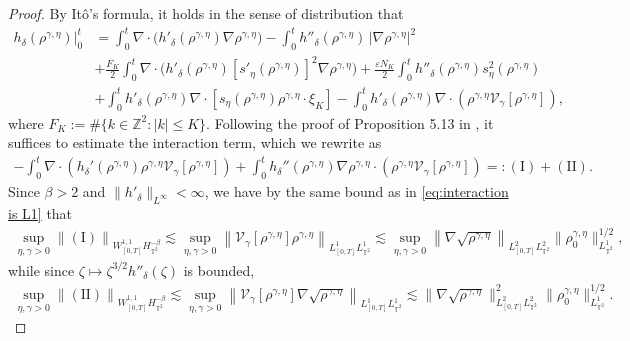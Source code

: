 \begin{proof}
By It\^o's formula, it holds in the sense of distribution that
\begin{align*}
h_{\delta}(\rho^{\gamma, \eta}) \Big|_0^t
& = \int_{0}^{t} \nabla \cdot \big(h'_{\delta}(\rho^{\gamma, \eta}) \nabla \rho^{\gamma, \eta}\big)
 - \int_{0}^{t} h''_{\delta}(\rho^{\gamma, \eta}) \, |\nabla \rho^{\gamma, \eta}|^{2} \\
& + \frac{F_K}{2}\int_{0}^{t} \nabla \cdot \big(h'_{\delta}(\rho^{\gamma, \eta}) [s'_{\eta}(\rho^{\gamma, \eta})]^{2} \nabla \rho^{\gamma, \eta}\big) + \frac{\varepsilon N_K}{2} \int_{0}^{t} h''_{\delta}(\rho^{\gamma, \eta}) s_{\eta}^{2}(\rho^{\gamma, \eta})\\
& + \int_{0}^{t} h'_{\delta}(\rho^{\gamma, \eta}) \nabla \cdot \left[ s_{\eta}(\rho^{\gamma, \eta})  \rho^{\gamma, \eta} \cdot \xi_K\right] -\int_{0}^{t} h'_{\delta}(\rho^{\gamma, \eta})\nabla\cdot(\rho^{\gamma, \eta}\mathcal{V}_{{\gamma}}[\rho^{\gamma, \eta}]),
\end{align*}
where $F_K := \#\{k \in \mathbb{Z}^2: |k| \leq K\}$. Following the proof of Proposition 5.13 in \cite{WWZ22}, it suffices to estimate the interaction term, which we rewrite as 
\begin{align*}
-\int_{0}^{t}\nabla \cdot \left(h_{\delta}'(\rho^{\gamma, \eta}) \rho^{\gamma, \eta} \mathcal{V}_{\gamma}[\rho^{\gamma, \eta}]\right)+\int_{0}^{t} h_{\delta}''(\rho^{\gamma, \eta}) \nabla \rho^{\gamma, \eta}\cdot \left(\rho^{\gamma, \eta} \mathcal{V}_{\gamma}[\rho^{\gamma, \eta}]\right) =: (\mathrm{I}) + (\mathrm{II}).
\end{align*}
Since $\beta > 2$ and $\|h'_{\delta}\|_{L^{\infty}} < \infty$, we have by the same bound as in \eqref{eq:interaction is L1} that
\begin{align*}
\sup_{\eta, \gamma > 0}\left\|(\mathrm{I})\right\|_{W_{[0,T]}^{1,1}H^{-\beta}_{\mathbb{T}^2}} \lesssim \sup_{\eta, \gamma > 0}\left\| \mathcal{V}_{\gamma}[\rho^{\gamma, \eta}]\rho^{\gamma, \eta}\right\|_{L^1_{[0,T]}L_{\mathbb{T}^2}^1} \lesssim \sup_{\eta, \gamma > 0}\left\|\nabla\sqrt{\rho^{\gamma, \eta}}\right\|_{L^2_{[0,T]}L_{\mathbb{T}^2}^{2}}\|\rho^{\gamma, \eta}_0\|^{1/2}_{L^1_{\mathbb{T}^2}},
\end{align*}
while since $\zeta \mapsto \zeta^{3/2} h''_{\delta}(\zeta)$ is bounded, 
\begin{align*}
\sup_{\eta, \gamma > 0}\left\|(\mathrm{II})\right\|_{W_{[0,T]}^{1,1}H^{-\beta}_{\mathbb{T}^2}} \lesssim \sup_{\eta, \gamma > 0}\left\| \mathcal{V}_{\gamma}[\rho^{\gamma, \eta}]\nabla \sqrt{\rho^{\gamma, \eta}}\right\|_{L^1_{[0,T]}L_{\mathbb{T}^2}^1} \lesssim \|\nabla \sqrt{\rho^{\gamma, \eta}}\|^{2}_{L^2_{[0,T]}L^2_{\mathbb{T}^2}}\|\rho^{\gamma, \eta}_0\|^{1/2}_{L^1_{\mathbb{T}^2}}.
\end{align*}
\end{proof}

